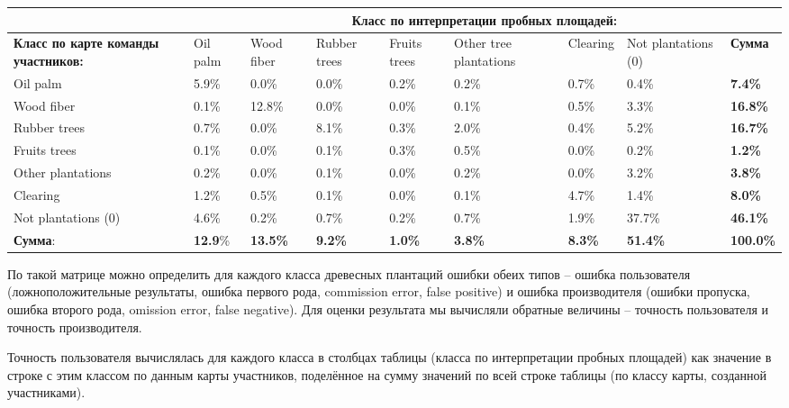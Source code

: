 \begin{center}
    \footnotesize
    \begin{tabular}{|p{2.8cm}|p{0.85cm}|p{0.85cm}|p{1cm}|p{0.9cm}|p{1.7cm}|p{1.2cm}|p{1.7cm}|p{1.1cm}|}
        \hline
         & \multicolumn{8}{c|}{\textbf{Класс по интерпретации пробных площадей:}} \\
        \hline
        \textbf{Класс по карте команды участников:} & Oil palm & Wood fiber & Rubber trees & 	Fruits trees & Other tree plantations & Clearing & Not plantations (0) & \textbf{Сумма} \\
        \hline
        Oil palm & 5.9\% & 0.0\% & 0.0\% & 0.2\% & 0.2\% & 0.7\% & 0.4\% & \textbf{7.4\%} \\
        \hline
        Wood fiber & 0.1\% & 12.8\% & 0.0\% & 0.0\% & 0.1\% & 0.5\% & 3.3\% & \textbf{16.8\%} \\
        \hline
        Rubber trees & 0.7\% & 0.0\% & 8.1\% & 0.3\% & 2.0\% & 0.4\% & 5.2\% & \textbf{16.7\%} \\
        \hline
        Fruits trees & 0.1\% & 0.0\% & 0.1\% & 0.3\% & 0.5\% & 0.0\% & 0.2\% & \textbf{1.2\%} \\
        \hline
        Other plantations & 0.2\% & 0.0\% & 0.1\% & 0.0\% & 0.2\% & 0.0\% & 3.2\% & \textbf{3.8\%} \\
        \hline
        Clearing & 1.2\% & 0.5\% & 0.1\% & 0.0\% & 0.1\% & 4.7\% & 1.4\% & \textbf{8.0\%} \\
        \hline
        Not plantations (0) & 4.6\% & 0.2\% & 0.7\% & 0.2\% & 0.7\% & 1.9\% & 37.7\% & \textbf{46.1\%} \\
        \hline      
        \textbf{Сумма}: & \textbf{12.9}\% & \textbf{13.5\%} & \textbf{9.2\%} & \textbf{1.0\%} & \textbf{3.8\%} & \textbf{8.3\%} & \textbf{51.4\%} & \textbf{100.0\%} \\
        \hline
    \end{tabular}
\end{center}

По такой матрице можно определить для каждого класса древесных плантаций ошибки обеих типов – ошибка пользователя (ложноположительные результаты, ошибка первого рода, commission error, false positive) и ошибка производителя (ошибки пропуска, ошибка второго рода, omission error, false negative). Для оценки результата мы вычисляли обратные величины – точность пользователя и точность производителя.

Точность пользователя вычислялась для каждого класса в столбцах таблицы (класса по интерпретации пробных площадей) как значение в строке с этим классом по данным карты участников, поделённое на сумму значений по всей строке таблицы (по классу карты, созданной участниками).

